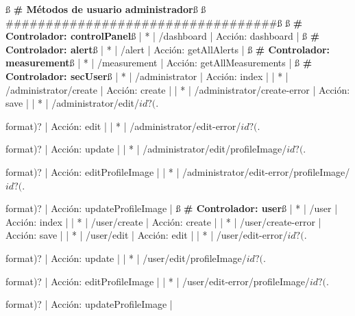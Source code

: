 \documentclass[12pt,a4paper, twoside]{report}
\begin{document}
\begin{listing}[style=consola, basicstyle=\ttfamily\scriptsize, numbers=none, escapechar=ß]
ß\textbf{{\color{maroon} \# Métodos de usuario administrador}}ß
ß{\color{maroon} \#\#\#\#\#\#\#\#\#\#\#\#\#\#\#\#\#\#\#\#\#\#\#\#\#\#\#\#\#\#\#\#\#\#}ß
ß\textbf{{\color{maroon} \# Controlador: controlPanel}}ß
|  *  | /dashboard                                      | Acción: dashboard                           |
ß\textbf{{\color{maroon} \# Controlador: alert}}ß
|  *  | /alert                                          | Acción: getAllAlerts                        |
ß\textbf{{\color{maroon} \# Controlador: measurement}}ß
|  *  | /measurement                                    | Acción: getAllMeasurements                  |
ß\textbf{{\color{maroon} \# Controlador: secUser}}ß
|  *  | /administrator                                  | Acción: index                               |
|  *  | /administrator/create                           | Acción: create                              |
|  *  | /administrator/create-error                     | Acción: save                                |
|  *  | /administrator/edit/${id}?(.${format)?          | Acción: edit                                |
|  *  | /administrator/edit-error/${id}?(.${format)?    | Acción: update                              |
|  *  | /administrator/edit/profileImage/${id}?(.${format)?        | Acción: editProfileImage         |
|  *  | /administrator/edit-error/profileImage/${id}?(.${format)?  | Acción: updateProfileImage       |      
ß\textbf{{\color{maroon} \# Controlador: user}}ß
|  *  | /user                                           | Acción: index                               |
|  *  | /user/create                                    | Acción: create                              |
|  *  | /user/create-error                              | Acción: save                                |
|  *  | /user/edit                                      | Acción: edit                                |
|  *  | /user/edit-error/${id}?(.${format)?             | Acción: update                              |
|  *  | /user/edit/profileImage/${id}?(.${format)?      | Acción: editProfileImage                    |
|  *  | /user/edit-error/profileImage/${id}?(.${format)?  | Acción: updateProfileImage                |
 
}}}}}}}
\end{listing}
\end{document}
